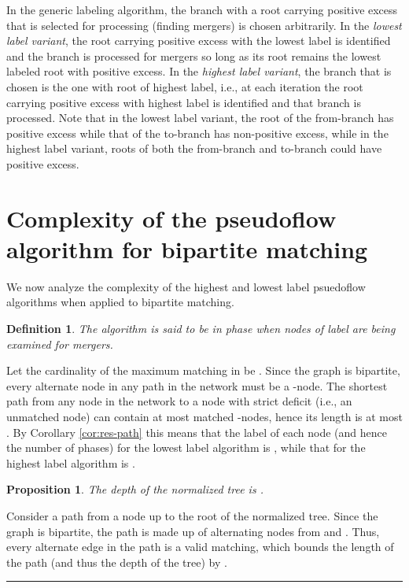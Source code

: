 \documentclass{article}
\newtheorem{proposition}{Proposition}[section]
\newtheorem{definition}{Definition}[section]
\newenvironment{proof}[1][Proof:]{\begin{trivlist}
\item[\hskip \labelsep {\bfseries #1}]}{\end{trivlist}}
\newcommand{\qed}{\hfill \rule{2.5mm}{2.5mm}}
\begin{document}
In the generic labeling algorithm, the branch with a root carrying positive excess that is selected for processing (finding mergers) is chosen arbitrarily. In the {\em lowest label variant}, the root carrying positive excess with the lowest label is identified and the branch is processed for mergers so long as its root remains the lowest labeled root with positive excess.  In the {\em highest label variant}, the branch that is chosen is the one with root of highest label, i.e., at each iteration the root carrying positive excess with highest label is identified and that branch is processed.  Note that in the lowest label variant, the root of the from-branch has positive excess while that of the to-branch has non-positive excess, while in the highest label variant, roots of both the from-branch and to-branch could have positive excess.

\section{Complexity of the pseudoflow algorithm for bipartite matching}
\label{section:bipcomplexity}

We now analyze the complexity of the highest and lowest label psuedoflow algorithms when applied to bipartite matching.

\begin{definition}
The algorithm is said to be in {\em phase } when nodes of label  are being examined for mergers.
\end{definition}

Let the cardinality of the maximum matching in  be .  Since the graph is bipartite, every alternate node in any path in the network must be a -node.  The shortest path from any node in the network to a node with strict deficit (i.e., an unmatched  node) can contain at most  matched -nodes, hence its length is at most .  By Corollary \ref{cor:res-path} this means that the label of each node (and hence the number of phases) for the lowest label algorithm is , while that for the highest label algorithm is .

\begin{proposition}
The depth of the normalized tree is .
\end{proposition}
\begin{proof}
Consider a path from a node up to the root of the normalized tree.  Since the graph is bipartite, the path is made up of alternating nodes from  and .  Thus, every alternate edge in the path is a valid matching, which bounds the length of the path (and thus the depth of the tree) by .\qed
\end{proof}
\end{document}

